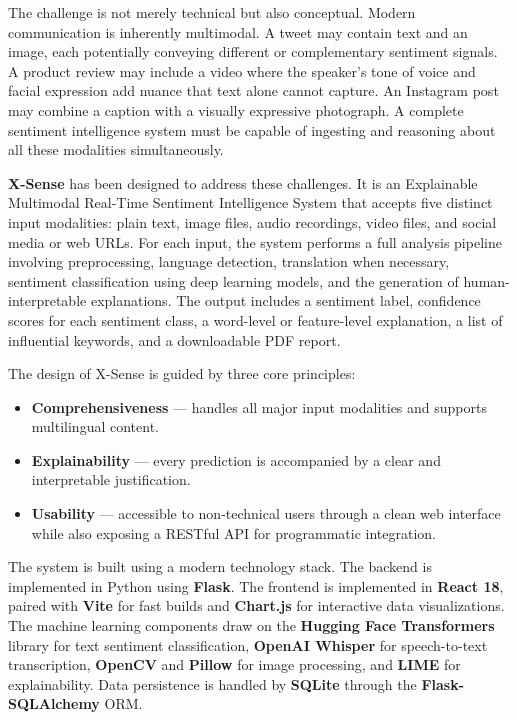 \documentclass[12pt, a4paper]{report}
\begin{document}
The challenge is not merely technical but also conceptual. Modern communication is inherently multimodal. A tweet may contain text and an image, each potentially conveying different or complementary sentiment signals. A product review may include a video where the speaker's tone of voice and facial expression add nuance that text alone cannot capture. An Instagram post may combine a caption with a visually expressive photograph. A complete sentiment intelligence system must be capable of ingesting and reasoning about all these modalities simultaneously.

\textbf{X-Sense} has been designed to address these challenges. It is an Explainable Multimodal Real-Time Sentiment Intelligence System that accepts five distinct input modalities: plain text, image files, audio recordings, video files, and social media or web URLs. For each input, the system performs a full analysis pipeline involving preprocessing, language detection, translation when necessary, sentiment classification using deep learning models, and the generation of human-interpretable explanations. The output includes a sentiment label, confidence scores for each sentiment class, a word-level or feature-level explanation, a list of influential keywords, and a downloadable PDF report.

The design of X-Sense is guided by three core principles:

\begin{itemize}[noitemsep, leftmargin=1.5em]
    \item \textbf{Comprehensiveness} --- handles all major input modalities and supports multilingual content.
    \item \textbf{Explainability} --- every prediction is accompanied by a clear and interpretable justification.
    \item \textbf{Usability} --- accessible to non-technical users through a clean web interface while also exposing a RESTful API for programmatic integration.
\end{itemize}

The system is built using a modern technology stack. The backend is implemented in Python using \textbf{Flask}. The frontend is implemented in \textbf{React 18}, paired with \textbf{Vite} for fast builds and \textbf{Chart.js} for interactive data visualizations. The machine learning components draw on the \textbf{Hugging Face Transformers} library for text sentiment classification, \textbf{OpenAI Whisper} for speech-to-text transcription, \textbf{OpenCV} and \textbf{Pillow} for image processing, and \textbf{LIME} for explainability. Data persistence is handled by \textbf{SQLite} through the \textbf{Flask-SQLAlchemy} ORM.
\end{document}
